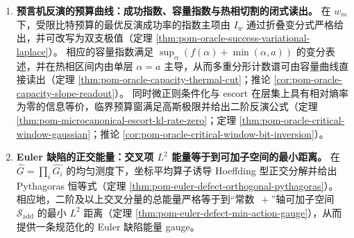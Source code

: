 \begin{enumerate}
  \item \textbf{预言机反演的预算曲线：成功指数、容量指数与热相切割的闭式读出。}
  在 \(w_m\) 下，受限比特预算的最优反演成功率的指数主项由 \(I_w\) 通过折叠变分式严格给出，并可改写为双支极值（定理 \ref{thm:pom-oracle-success-variational-laplace}）。
  相应的容量指数满足 \(\sup_{\alpha}(f(\alpha)+\min(\alpha,a))\) 的变分表述，并在热相区间内由单层 \(\alpha=a\) 主导，从而多重分形计数谱可由容量曲线直接读出（定理 \ref{thm:pom-oracle-capacity-thermal-cut}；推论 \ref{cor:pom-oracle-capacity-slope-readout}）。
  同时微正则条件化与 escort 在层集上具有相对熵率为零的信息等价，临界预算窗满足高斯极限并给出二阶反演公式（定理 \ref{thm:pom-microcanonical-escort-kl-rate-zero}；定理 \ref{thm:pom-oracle-critical-window-gaussian}；推论 \ref{cor:pom-oracle-critical-window-bit-inversion}）。

  \item \textbf{Euler 缺陷的正交能量：交叉项 \texorpdfstring{$L^2$}{L2} 能量等于到可加子空间的最小距离。}
  在 \(\widehat G=\prod_i\widehat{G_i}\) 的均匀测度下，坐标平均算子诱导 Hoeffding 型正交分解并给出 Pythagoras 恒等式（定理 \ref{thm:pom-euler-defect-orthogonal-pythagoras}）。
  相应地，二阶及以上交叉分量的总能量严格等于到“常数 \(\,+\)”轴可加子空间 \(\mathcal S_{\mathrm{add}}\) 的最小 \(L^2\) 距离（定理 \ref{thm:pom-euler-defect-min-action-gauge}），从而提供一条规范化的 Euler 缺陷能量 gauge。
\end{enumerate}

